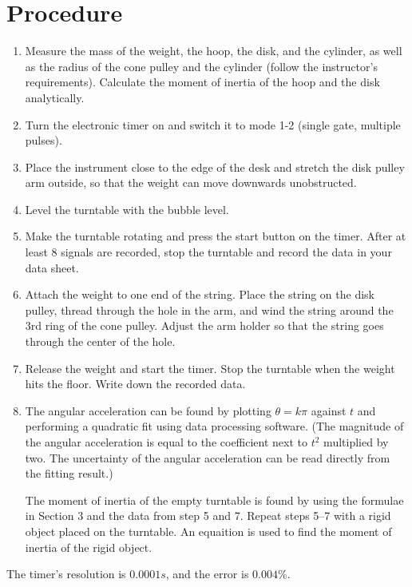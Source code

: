 \section{Procedure}
\begin{enumerate}
\item Measure the mass of the weight, the hoop, the disk, and the cylinder, as
  well as the radius of the cone pulley and the cylinder (follow the
  instructor’s requirements). Calculate the moment of inertia of the hoop and
  the disk analytically.
\item Turn the electronic timer on and switch it to mode 1-2 (single gate,
  multiple pulses). 
\item Place the instrument close to the edge of the desk and stretch the disk
  pulley arm outside, so that the weight can move downwards unobstructed. 
\item Level the turntable with the bubble level.
\item Make the turntable rotating and press the start button on the timer. After
  at least 8 signals are recorded, stop the turntable and record the data in
  your data sheet. 
\item Attach the weight to one end of the string. Place the string on the disk
  pulley, thread through the hole in the arm, and wind the string around the 3rd
  ring of the cone pulley. Adjust the arm holder so that the string goes through
  the center of the hole. 
\item Release the weight and start the timer. Stop the turntable when the weight
  hits the floor. Write down the recorded data. 
\item The angular acceleration can be found by plotting $\theta =k\pi$ against
  $t$ and performing a quadratic fit using data processing software. (The
  magnitude of the angular acceleration is equal to the coefficient next to
  $t^2$ multiplied by two. The uncertainty of the angular acceleration can be
  read directly from the fitting result.) 

  The moment of inertia of the empty turntable is found by using the formulae in
  Section 3 and the data from step 5 and 7. Repeat steps 5--7 with a rigid
  object placed on the turntable. An equaition is used to find the moment of
  inertia of the rigid object. 
\end{enumerate}
The timer’s resolution is $0.0001 s$, and the error is $0.004\%$. 